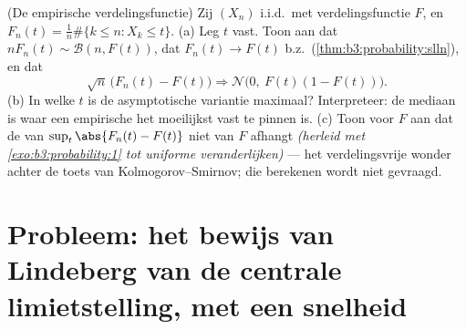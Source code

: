 \begin{exercise}[$\star\star$]\label{exo:b3:clt:12}
(De empirische verdelingsfunctie) Zij $(X_n)$ i.i.d.\ met
verdelingsfunctie $F$, en $F_n(t) = \frac1n\#\{k \leq n : X_k
\leq t\}$.
(a) Leg $t$ vast. Toon aan dat $n F_n(t) \sim \mathcal B(n,
F(t))$, dat $F_n(t) \to F(t)$ b.z.\
(\cref{thm:b3:probability:slln}), en dat
\[
\sqrt n\,\bigl(F_n(t) - F(t)\bigr) \Longrightarrow
\mathcal N\bigl(0,\ F(t)(1 - F(t))\bigr) .
\]
(b) In welke $t$ is de asymptotische variantie maximaal?
Interpreteer: de mediaan is waar een empirische  het
moeilijkst vast te pinnen is.
(c) Toon voor  $F$ aan dat de  van
$\sup_t\abs{F_n(t) - F(t)}$ niet van $F$ afhangt \emph{(herleid
met \cref{exo:b3:probability:1} tot uniforme veranderlijken)} ---
het verdelingsvrije wonder achter de toets van
Kolmogorov--Smirnov; die  berekenen wordt niet gevraagd.
\end{exercise}

\section{Probleem: het bewijs van Lindeberg van de centrale
limietstelling, met een snelheid}

